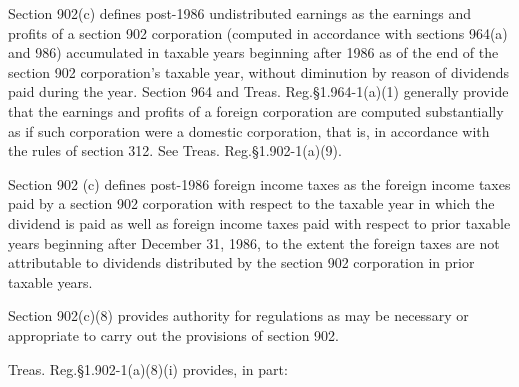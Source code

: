 \begin{select}
Section 902(c) defines post-1986 undistributed earnings as the earnings and profits of a section 902 corporation (computed in accordance with sections 964(a) and 986) accumulated in taxable years beginning after 1986 as of the end of the section 902 corporation's taxable year, without diminution by reason of dividends paid during the year. Section 964 and Treas. Reg.\@ \S1.964-1(a)(1) generally provide that the earnings and profits of a foreign corporation are computed substantially as if such corporation were a domestic corporation, that is, in accordance with the rules of section 312. See Treas. Reg.\@ \S1.902-1(a)(9).

Section 902 (c) defines post-1986 foreign income taxes as the foreign income taxes paid by a section 902 corporation with respect to the taxable year in which the dividend is paid as well as foreign income taxes paid with respect to prior taxable years beginning after December 31, 1986, to the extent the foreign taxes are not attributable to dividends distributed by the section 902 corporation in prior taxable years.

Section 902(c)(8) provides authority for regulations as may be necessary or appropriate to carry out the provisions of section 902. 

Treas. Reg.\@ \S1.902-1(a)(8)(i) provides, in part:


\end{select}
